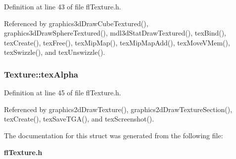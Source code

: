 Definition at line 43 of file fl\-Texture.h.

Referenced by graphics3d\-Draw\-Cube\-Textured(), graphics3d\-Draw\-Sphere\-Textured(), mdl3d\-Stat\-Draw\-Textured(), tex\-Bind(), tex\-Create(), tex\-Free(), tex\-Mip\-Map(), tex\-Mip\-Map\-Add(), tex\-Move\-VMem(), tex\-Swizzle(), and tex\-Unswizzle().
\subsubsection{ {\bf Texture::tex\-Alpha}}\label{structTexture_1e77e466ea5a49a2b60ee743b00d2605}




Definition at line 45 of file fl\-Texture.h.

Referenced by graphics2d\-Draw\-Texture(), graphics2d\-Draw\-Texture\-Section(), tex\-Create(), tex\-Save\-TGA(), and tex\-Screenshot().

The documentation for this struct was generated from the following file:\begin{CompactItemize}
\item 
{\bf fl\-Texture.h}\end{CompactItemize}
